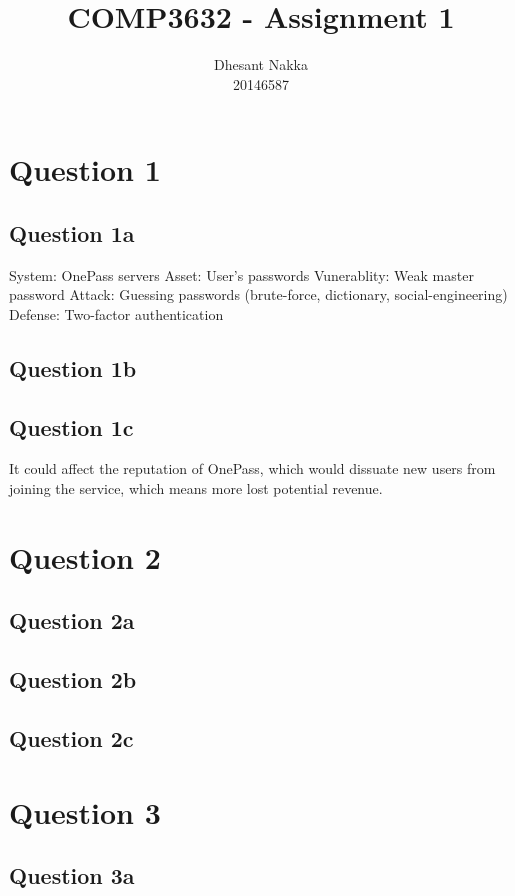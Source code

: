 \documentclass[12pt,a4paper]{article}
\title{COMP3632 - Assignment 1}
\author{Dhesant Nakka\\20146587}
\begin{document}
\maketitle

\section{Question 1}
\subsection{Question 1a}
System: OnePass servers
Asset: User's passwords
Vunerablity: Weak master password
Attack: Guessing passwords (brute-force, dictionary, social-engineering)
Defense: Two-factor authentication

\subsection{Question 1b}

\subsection{Question 1c}
It could affect the reputation of OnePass, which would dissuate new users from joining the service, which means more lost potential revenue.

\section{Question 2}
\subsection{Question 2a}


\subsection{Question 2b}


\subsection{Question 2c}


\section{Question 3}
\subsection{Question 3a}
\end{document}
